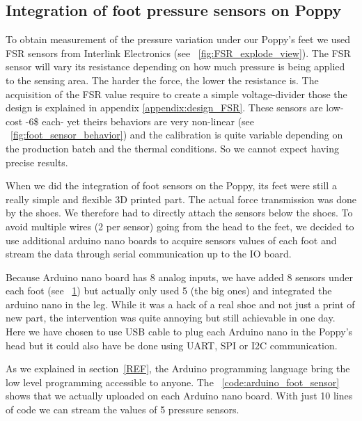 \subsection{Integration of foot pressure sensors on Poppy} %

To obtain measurement of the pressure variation under our Poppy's feet we used FSR sensors from Interlink Electronics (see \figurename~\ref{fig:FSR_explode_view}). The FSR sensor will vary its resistance depending on how much pressure is being applied to the sensing area. The harder the force, the lower the resistance is. The acquisition of the FSR value require to create a simple voltage-divider those the design is explained in appendix \ref{appendix:design_FSR}. These sensors are low-cost -6\$ each- yet theirs behaviors are very non-linear (see \figurename~\ref{fig:foot_sensor_behavior}) and the calibration is quite variable depending on the production batch and the thermal conditions. So we cannot expect having precise results.

When we did the integration of foot sensors on the Poppy, its feet were still a really simple and flexible 3D printed part. The actual force transmission was done by the shoes. We therefore had to directly attach the sensors below the shoes.
To avoid multiple wires (2 per sensor) going from the head to the feet, we decided to use additional arduino nano boards to acquire sensors values of each foot and stream the data through serial communication up to the IO board.

Because Arduino nano board has 8 analog inputs, we have added 8 sensors under each foot (see \figurename~\ref{fig:poppy_foot_sensors}) but actually only used 5 (the big ones) and integrated the arduino nano in the leg. While it was a hack of a real shoe and not just a print of new part, the intervention was quite annoying but still achievable in one day. Here we have chosen to use USB cable to plug each Arduino nano in the Poppy's head but it could also have be done using UART, SPI or I2C communication.

\begin{figure}[ht]
\centering
    \hfil
    \caption{}
    \label{fig:poppy_foot_sensors}
\end{figure}


As we explained in section~\ref{REF}, the Arduino programming language bring the low level programming accessible to anyone. The \codename~\ref{code:arduino_foot_sensor} shows that we actually uploaded on each Arduino nano board. With just 10 lines of code we can stream the values of 5 pressure sensors.

